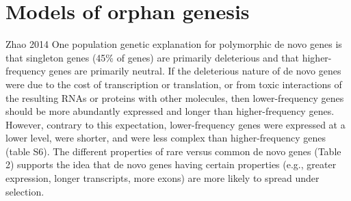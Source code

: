 \section{Models of orphan genesis}


\begin{aquote}{Zhao 2014 \cite{zhao_origin_2014}}
One population genetic explanation for polymorphic de novo genes is that
singleton genes (45\% of genes) are primarily deleterious and that
higher-frequency genes are primarily neutral. If the deleterious nature of de
novo genes were due to the cost of transcription or translation, or from toxic
interactions of the resulting RNAs or proteins with other molecules, then
lower-frequency genes should be more abundantly expressed and longer than
higher-frequency genes. However, contrary to this expectation, lower-frequency
genes were expressed at a lower level, were shorter, and were less complex than
higher-frequency genes (table S6). The different properties of rare versus
common de novo genes (Table 2) supports the idea that de novo genes having
certain properties (e.g., greater expression, longer transcripts, more exons)
are more likely to spread under selection.
\end{aquote}
